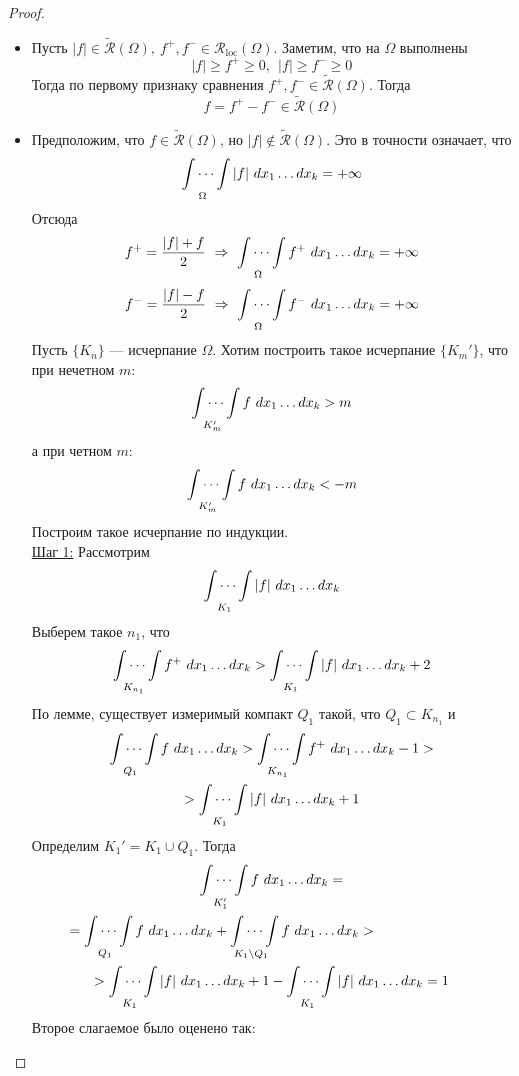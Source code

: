 \begin{proof}\tab %
    \begin{itemize}
        \item[$(\Leftarrow)$:] Пусть $|f|\in \widetilde{\mathcal{R}}(\Omega),\ f^+, f^-\in \mathcal{R}_{\text{loc}}(\Omega)$. Заметим, что на $\Omega$ выполнены
        \[|f|\geq f^+\geq 0,\ \ |f|\geq f^-\geq 0\]
        Тогда по первому признаку сравнения 
        $f^+,f^-\in \widetilde{\mathcal{R}}(\Omega)$. Тогда 
        \[f=f^+-f^-\in \widetilde{\mathcal{R}}(\Omega)\]
        \item[$(\Rightarrow)$:] Предположим, что $f\in \widetilde{\mathcal{R}}(\Omega)$, но $|f|\not\in \widetilde{\mathcal{R}}(\Omega)$. Это в точности означает, что
        \[\idotsint\limits_{\Omega}|f|\ dx_1 \dots dx_k=+\infty\]
        Отсюда
        \[f^+=\frac{|f|+f}{2}\ \Rightarrow\ \idotsint\limits_{\Omega}f^+\ dx_1 \dots dx_k=+\infty\]
        \[f^-=\frac{|f|-f}{2}\ \Rightarrow\ \idotsint\limits_{\Omega}f^-\ dx_1 \dots dx_k=+\infty\]
        Пусть $\{K_n\}$ --- исчерпание $\Omega$. Хотим построить такое исчерпание $\{K_m'\}$, что при нечетном $m$:
        \[\idotsint\limits_{K_m'}f\ dx_1 \dots dx_k>m\]
        а при четном $m$:
        \[\idotsint\limits_{K_m'}f\ dx_1 \dots dx_k<-m\]
        Построим такое исчерпание по индукции.\\
        \underline{Шаг 1:} Рассмотрим
        \[\idotsint\limits_{K_1}|f|\ dx_1 \dots dx_k\]
        Выберем такое $n_1$, что
        \[\idotsint\limits_{K_{n_1}}f^+\ dx_1 \dots dx_k> \idotsint\limits_{K_1}|f|\ dx_1\dots dx_k+2\]
        По лемме, существует измеримый компакт $Q_1$ такой, что $Q_1\subset K_{n_1}$ и
        \begin{multline*}
            \idotsint\limits_{Q_1}f\ dx_1 \dots dx_k>\idotsint\limits_{K_{n_1}}f^+\ dx_1 \dots dx_k-1>\\
            >\idotsint\limits_{K_1}|f|\ dx_1 \dots dx_k+1
        \end{multline*}
        Определим $K_1'=K_1\cup Q_1$. Тогда
        \begin{multline*}
            \idotsint\limits_{K_1'}f\ dx_1 \dots dx_k=\\
            =\idotsint\limits_{Q_1}f\ dx_1 \dots dx_k+\idotsint\limits_{K_1\setminus Q_1}f\ dx_1 \dots dx_k>\tab[2.5cm]\\
            >\idotsint\limits_{K_1}|f|\ dx_1 \dots dx_k +1 -\idotsint\limits_{K_1}|f|\ dx_1 \dots dx_k=1
        \end{multline*} 
        Второе слагаемое было оценено так:

\end{itemize}
\end{proof}
